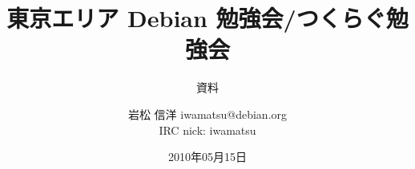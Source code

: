 




\documentclass[cjk,dvipdfmx,12pt]{beamer}
\usepackage{monthlypresentation}


\title{東京エリア Debian 勉強会/つくらぐ勉強会}
\subtitle{資料}
\author{岩松 信洋 iwamatsu@debian.org\\IRC nick: iwamatsu}
\date{2010年05月15日}



